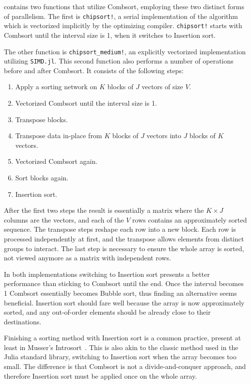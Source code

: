 \documentclass{juliacon}
\begin{document}
\chipsort contains two functions that utilize Combsort, employing these two distinct forms of parallelism. The first is {\tt chipsort!}, a serial implementation of the algorithm which is vectorized implicitly by the optimizing compiler. {\tt chipsort!} starts with Combsort until the interval size is 1, when it switches to Insertion sort.

The other function is {\tt chipsort\_medium!}, an explicitly vectorized implementation utilizing {\tt SIMD.jl}. This second function also performs a number of operations before and after Combsort. It consists of the following steps:
\begin{enumerate}
\item Apply a sorting network on $K$ blocks of $J$ vectors of size $V$.
\item Vectorized Combsort until the interval size is 1.
\item Transpose blocks.
\item Transpose data in-place from $K$ blocks of $J$ vectors into $J$ blocks of $K$ vectors.
\item Vectorized Combsort again.
\item Sort blocks again.
\item Insertion sort.
\end{enumerate}

After the first two steps the result is essentially a matrix where the $K\times J$ columns are the vectors, and each of the $V$ rows contains an approximately sorted sequence. The transpose steps reshape each row into a new block. Each row is processed independently at first, and the transpose allows elements from distinct groups to interact. The last step is necessary to ensure the whole array is sorted, not viewed anymore as a matrix with independent rows.

In both implementations switching to Insertion sort presents a better performance than sticking to Combsort until the end. Once the interval becomes 1 Combsort essentially becomes Bubble sort, thus finding an alternative seems beneficial. Insertion sort should fare well because the array is now approximately sorted, and any out-of-order elements should be already close to their destinations.

Finishing a sorting method with Insertion sort is a common practice, present at least in Musser's Introsort~\cite{musser1997introspective}. This is also akin to the classic method used in the Julia standard library, switching to Insertion sort when the array becomes too small. The difference is that Combsort is not a divide-and-conquer approach, and therefore Insertion sort must be applied once on the whole array.
\end{document}
